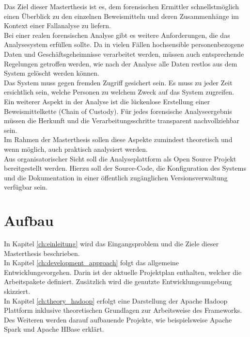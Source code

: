 \noindent
Das Ziel dieser Masterthesis ist es, dem forensischen Ermittler schnellstmöglich einen Überblick zu den einzelnen Beweismitteln und deren Zusammenhänge im Kontext einer Fallanalyse zu liefern. \\

\noindent
Bei einer realen forensischen Analyse gibt es weitere Anforderungen, die das Analysesystem erfüllen sollte. Da in vielen Fällen hochsensible personenbezogene Daten und Geschäftsgeheimnisse verarbeitet werden, müssen auch entsprechende Regelungen getroffen werden, wie nach der Analyse alle Daten restlos aus dem System gelöscht werden können.\\
Das System muss gegen fremden Zugriff gesichert sein. Es muss zu jeder Zeit ersichtlich sein, welche Personen zu welchem Zweck auf das System zugreifen.\\
Ein weiterer Aspekt in der Analyse ist die lückenlose Erstellung einer Beweismittelkette (Chain of Custody). Für jedes forensische Analyseergebnis müssen die Herkunft und die Verarbeitungsschritte transparent nachvollziehbar sein.\\
Im Rahmen der Masterthesis sollen diese Aspekte zumindest theoretisch und wenn möglich, auch praktisch analysiert werden.\\

\noindent
Aus organisatorischer Sicht soll die Analyseplattform als Open Source Projekt bereitgestellt werden. Hierzu soll der Source-Code, die Konfiguration des Systems und die Dokumentation in einer öffentlich zugänglichen Versionsverwaltung verfügbar sein.\\


\clearpage
\section{Aufbau}
In Kapitel \ref{ch:einleitung} wird das Eingangsproblem und die Ziele dieser Masterthesis beschrieben.\\ 

\noindent
In Kapitel \ref{ch:development_approach} folgt das allgemeine Entwicklungsvorgehen. Darin ist der aktuelle Projektplan enthalten, welcher die Arbeitspakete definiert.
Zusätzlich wird die genutzte Entwicklungsumgebung skizziert.\\

\noindent
In Kapitel \ref{ch:theory_hadoop} erfolgt eine Darstellung der Apache Hadoop Plattform inklusive theoretischen Grundlagen zur Arbeitsweise des Frameworks. Des Weiteren werden darauf aufbauende Projekte, wie beispielsweise Apache Spark und Apache HBase erklärt.\\

